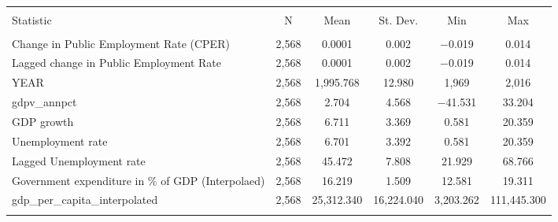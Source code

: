 
\begin{table}[!htbp] \centering 
  \caption{} 
  \label{} 
\footnotesize 
\begin{tabular}{@{\extracolsep{5pt}}lccccc} 
\\[-1.8ex]\hline 
\hline \\[-1.8ex] 
Statistic & \multicolumn{1}{c}{N} & \multicolumn{1}{c}{Mean} & \multicolumn{1}{c}{St. Dev.} & \multicolumn{1}{c}{Min} & \multicolumn{1}{c}{Max} \\ 
\hline \\[-1.8ex] 
Change in Public Employment Rate (CPER) & 2,568 & 0.0001 & 0.002 & $-$0.019 & 0.014 \\ 
Lagged change in Public Employment Rate & 2,568 & 0.0001 & 0.002 & $-$0.019 & 0.014 \\ 
YEAR & 2,568 & 1,995.768 & 12.980 & 1,969 & 2,016 \\ 
gdpv\_annpct & 2,568 & 2.704 & 4.568 & $-$41.531 & 33.204 \\ 
GDP growth & 2,568 & 6.711 & 3.369 & 0.581 & 20.359 \\ 
Unemployment rate & 2,568 & 6.701 & 3.392 & 0.581 & 20.359 \\ 
Lagged Unemployment rate & 2,568 & 45.472 & 7.808 & 21.929 & 68.766 \\ 
Government expenditure in \% of GDP (Interpolaed) & 2,568 & 16.219 & 1.509 & 12.581 & 19.311 \\ 
gdp\_per\_capita\_interpolated & 2,568 & 25,312.340 & 16,224.040 & 3,203.262 & 111,445.300 \\ 
\hline \\[-1.8ex] 
\end{tabular} 
\end{table} 
